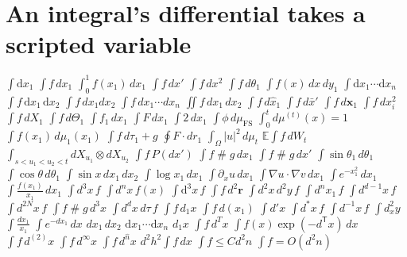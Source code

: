 \documentclass{article}
\begin{document}
\section{An integral's differential takes a scripted variable}
$\int\mathrm{d}x_1$ $\int f\,dx_1$ $\int_0^1 f(x_1)\,dx_1$ $\int f\,dx'$ $\int f\,dx^2$ $\int f\,d\theta_1$ $\int f(x)\,dx\,dy_1$
$\int\mathrm{d}x_1\cdots\mathrm{d}x_n$ $\int f\,\mathrm{d}x_1\,\mathrm{d}x_2$ $\int f\,dx_1 dx_2$ $\int f\,dx_1\cdots dx_n$ $\iint f\,dx_1\,dx_2$
$\int f\,d\hat{x}_1$ $\int f\,d\bar{x}'$ $\int f\,d\mathbf{x}_1$ $\int f\,dx_i^2$ $\int f\,dX_1$ $\int f\,d\Theta_1$ $\int f_1\,dx_1$
$\int F\,dx_1$ $\int 2\,dx_1$ $\int\phi\,d\mu_{\mathrm{FS}}$ $\int_0^t d\mu^{(t)}(x)=1$ $\int f(x_1)\,d\mu_1(x_1)$ $\int f\,d\tau_1+g$
$\oint F\cdot dr_1$ $\int_\Omega|u|^2\,d\mu_t$ $\mathbb{E}\int f\,dW_t$ $\int_{s<u_1<u_2<t}dX_{u_1}\otimes dX_{u_2}$ $\int f\,P(dx')$
$\int f\mathbin{\#} g\,dx_1$ $\int f\mathbin{\#} g\,dx'$ $\int\sin\theta_1\,d\theta_1$ $\int\cos\theta\,d\theta_1$ $\int\sin x\,dx_1\,dx_2$
$\int\log x_1\,dx_1$ $\int\partial_x u\,dx_1$ $\int\nabla u\cdot\nabla v\,dx_1$ $\int e^{-x_1^2}\,dx_1$ $\int\frac{f(x_1)}{x_1}\,dx_1$
$\int\!d^3x\,f$ $\int d^nx\,f(x)$ $\int\mathrm{d}^3x\,f$ $\int f\,d^2\mathbf{r}$ $\int d^2x\,d^2y\,f$ $\int d^nx_1\,f$ $\int d^{d-1}x\,f$
$\int d^{2N}x\,f$ $\int f\mathbin{\#} g\,d^3x$ $\int d^dx\,d\tau\,f$
$\int f\,d_1x$ $\int f\,d(x_1)$ $\int d'x$ $\int d^*x\,f$ $\int d^{-1}x\,f$ $\int d^2_xy$ $\int\frac{dx_1}{x_1}$ $\int e^{-dx_1}\,dx$
$dx_1\,dx_2$ $\mathrm{d}x_1\cdots\mathrm{d}x_n$ $d_1x$
$\int f\,d^Tx$ $\int f(x)\exp(-d^{\mathsf{T}}x)\,dx$ $\int f\,d^{(2)}x$ $\int f\,d^\infty x$ $\int f\,d^{\hat n}x$
$d^2h^2\int f\,dx$ $\int f\le C d^2 n$ $\int f=O(d^2n)$
\end{document}
